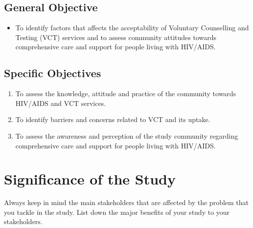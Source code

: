 \documentclass{strrespaper-trad}
\begin{document}
			\subsection{General Objective}
				\begin{itemize}
					\item To identify factors that affects the acceptability of Voluntary Counselling and Testing (VCT) services and to assess community attitudes towards comprehensive care and support for people living with HIV/AIDS.
				\end{itemize}
			\subsection{Specific Objectives}
				\begin{enumerate}
					\item To assess the knowledge, attitude and practice of the community towards HIV/AIDS and VCT services.
					\item To identify barriers and concerns related to VCT and its uptake.
					\item To assess the awareness and perception of the study community regarding comprehensive care and support for people living with HIV/AIDS.
				\end{enumerate}

		\section{Significance of the Study}

			Always keep in mind the main stakeholders that are affected by the problem that you tackle in the study.
			List down the major benefits of your study to your stakeholders.
\end{document}
